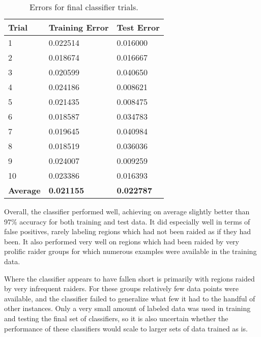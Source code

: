 \documentclass[12pt]{article}
\begin{document}
\begin{table*}\centering
	\renewcommand{\arraystretch}{1.3}
		\begin{tabular}{@{}m{2cm}m{4cm}m{4cm}@{}}
			\toprule
			\textbf{Trial} & \textbf{Training Error} & \textbf{Test Error} \\
			\midrule
			1 & 0.022514 & 0.016000 \\
			2 & 0.018674 & 0.016667 \\
			3 & 0.020599 & 0.040650 \\
			4 & 0.024186 & 0.008621 \\
			5 & 0.021435 & 0.008475 \\
			6 & 0.018587 & 0.034783 \\
			7 & 0.019645 & 0.040984 \\
			8 & 0.018519 & 0.036036 \\
			9 & 0.024007 & 0.009259 \\
			10 & 0.023386 & 0.016393 \\
			\textbf{Average} & \textbf{0.021155} & \textbf{0.022787} \\
			\bottomrule
		\end{tabular}
	\caption{Errors for final classifier trials.}
\end{table*}

Overall, the classifier performed well, achieving on average slightly better than 97\% accuracy for both training and test data. It did especially well in terms of false positives, rarely labeling regions which had not been raided as if they had been. It also performed very well on regions which had been raided by very prolific raider groups for which numerous examples were available in the training data.

Where the classifier appears to have fallen short is primarily with regions raided by very infrequent raiders. For these groups relatively few data points were available, and the classifier failed to generalize what few it had to the handful of other instances. Only a very small amount of labeled data was used in training and testing the final set of classifiers, so it is also uncertain whether the performance of these classifiers would scale to larger sets of data trained as is.
\end{document}
